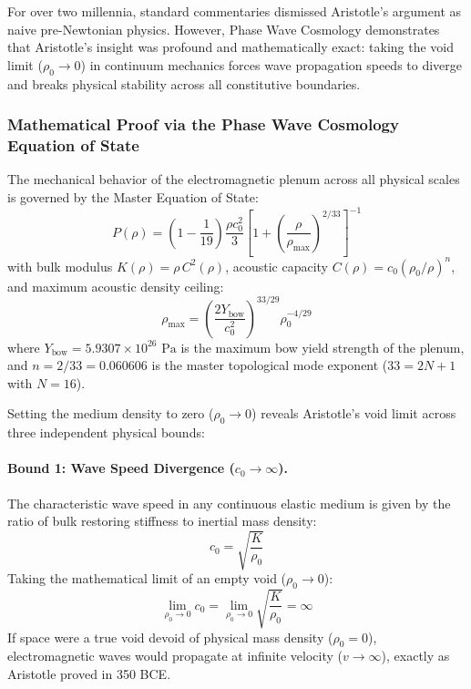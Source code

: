 \documentclass[11pt,a4paper]{article}
\begin{document}
For over two millennia, standard commentaries dismissed Aristotle's argument as naive pre-Newtonian physics. However, Phase Wave Cosmology demonstrates that Aristotle's insight was profound and mathematically exact: taking the void limit ($\rho_0 \to 0$) in continuum mechanics forces wave propagation speeds to diverge and breaks physical stability across all constitutive boundaries.

\subsubsection{Mathematical Proof via the Phase Wave Cosmology Equation of State}

The mechanical behavior of the electromagnetic plenum across all physical scales is governed by the Master Equation of State:
\begin{equation}
P(\rho) = \left(1 - \frac{1}{19}\right) \frac{\rho c_0^2}{3} \left[ 1 + \left( \frac{\rho}{\rho_{\max}} \right)^{2/33} \right]^{-1}
\label{eq:master_eos_fluid}
\end{equation}
with bulk modulus $K(\rho) = \rho \, C^2(\rho)$, acoustic capacity $C(\rho) = c_0 (\rho_0 / \rho)^{n}$, and maximum acoustic density ceiling:
\begin{equation}
\rho_{\max} = \left( \frac{2 Y_{\text{bow}}}{c_0^2} \right)^{33/29} \rho_0^{-4/29}
\label{eq:rho_max_ceiling}
\end{equation}
where $Y_{\text{bow}} = 5.9307 \times 10^{26}\text{ Pa}$ is the maximum bow yield strength of the plenum, and $n = 2/33 = 0.060606$ is the master topological mode exponent ($33 = 2N + 1$ with $N = 16$).

Setting the medium density to zero ($\rho_0 \to 0$) reveals Aristotle's void limit across three independent physical bounds:

\paragraph{Bound 1: Wave Speed Divergence ($c_0 \to \infty$).}
The characteristic wave speed in any continuous elastic medium is given by the ratio of bulk restoring stiffness to inertial mass density:
\begin{equation}
c_0 = \sqrt{\frac{K}{\rho_0}}
\end{equation}
Taking the mathematical limit of an empty void ($\rho_0 \to 0$):
\begin{equation}
\lim_{\rho_0 \to 0} c_0 = \lim_{\rho_0 \to 0} \sqrt{\frac{K}{\rho_0}} = \infty
\label{eq:wave_speed_divergence}
\end{equation}
If space were a true void devoid of physical mass density ($\rho_0 = 0$), electromagnetic waves would propagate at infinite velocity ($v \to \infty$), exactly as Aristotle proved in 350 BCE.
\end{document}
